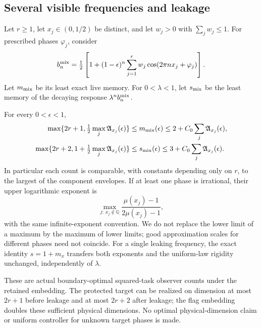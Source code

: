 \subsection{Several visible frequencies and leakage}
Let $r\ge1$, let $x_j\in(0,1/2)$ be distinct, and let $w_j>0$ with $\sum_jw_j\le1$. For prescribed phases $\varphi_j$, consider
\[
 b_n^{\rm mix}=\tfrac12\left[1+(1-\epsilon)^n
              \sum_{j=1}^r w_j\cos(2\pi nx_j+\varphi_j)\right].
\]
Let $m_{\rm mix}$ be its least exact live memory. For $0<\lambda<1$, let $s_{\rm mix}$ be the least memory of the decaying response $\lambda^n b_n^{\rm mix}$.

\begin{corollary}\label{cor:r71-mixtures}
For every $0<\epsilon<1$,
\begin{align}
 \max\{2r+1,\tfrac12\max_j\mathfrak A_{x_j}(\epsilon)\}
 &\le m_{\rm mix}(\epsilon)
 \le2+C_0\sum_j\mathfrak A_{x_j}(\epsilon),\label{eq:r71-mixture}\\
 \max\{2r+2,1+\tfrac12\max_j\mathfrak A_{x_j}(\epsilon)\}
 &\le s_{\rm mix}(\epsilon)
 \le3+C_0\sum_j\mathfrak A_{x_j}(\epsilon).\label{eq:r71-leaky-mixture}
\end{align}
In particular each count is comparable, with constants depending only on $r$, to the largest of the component envelopes. If at least one phase is irrational, their upper logarithmic exponent is
\[
 \max_{j:\,x_j\notin\mathbb Q}
       \frac{\mu(x_j)-1}{2\mu(x_j)-1},
\]
with the same infinite-exponent convention. We do not replace the lower limit of a maximum by the maximum of lower limits; good approximation scales for different phases need not coincide. For a single leaking frequency, the exact identity $s=1+m_x$ transfers both exponents and the uniform-law rigidity unchanged, independently of $\lambda$.

These are actual boundary-optimal squared-task observer counts under the retained embedding. The protected target can be realized on dimension at most $2r+1$ before leakage and at most $2r+2$ after leakage; the flag embedding doubles these sufficient physical dimensions. No optimal physical-dimension claim or uniform controller for unknown target phases is made.
\end{corollary}
